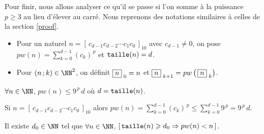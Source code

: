 Pour finir, nous allons analyser ce qu'il se passe si l'on somme à la puissance $p \geqslant 3$ au lieu d'élever au carré.
Nous reprenons des notations similaires à celles de la section \ref{proof}.
\begin{itemize}[label = \textbullet]
	\item Pour un naturel $n =  \left[ \, c_{d-1} c_{d-2} \cdots c_1 c_0 \, \right]_{10}$ avec $c_{d-1} \neq 0$,
	on pose
	$\displaystyle pw(n) = \sum_{k=0}^{d-1} (c_k)^{\,p}$
	et
	$\operatorname{\text{\normalfont\texttt{taille}}}(n) = d$.
	
	\item Pour $(n \,; k) \in \NN^2$, on définit 
	$\fbox{$n$}_{\,\,0} = n$
	et
	$\fbox{$n$}_{\,\,k+1} = pw \left( \, \fbox{$n$}_{\,\,k} \right)$.
\end{itemize}

 

\bigskip

\begin{fact}
	$\forall n \in \NN$, $pw(n) \leqslant 9^{\,p} \, d$ où $d = \operatorname{\text{\normalfont\texttt{taille}}}(n)$.
\end{fact}

\begin{proof*}
	Si $n = \left[ \, c_{d-1} c_{d-2} \cdots c_1 c_0 \, \right]_{10}$
	alors 
	$\displaystyle pw(n) = \sum_{k=0}^{d-1} (c_k)^{\,p} \leqslant \sum_{k=0}^{d-1} 9^{\,p} = 9^{\,p} \, d $.
\end{proof*}




\medskip

\begin{fact}\label{magicmajo}
	Il existe $d_0 \in \NN$ tel que $\forall n \in \NN$,	
	$[ \, \operatorname{\text{\normalfont\texttt{taille}}}(n) \geqslant d_0 \Rightarrow pw(n) < n \, ]$.
\end{fact}

